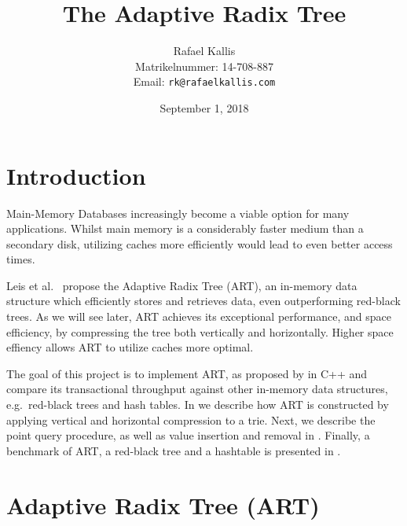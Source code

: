\documentclass[abstracton,12pt]{scrartcl}
\title{The Adaptive Radix Tree}
\author{
    Rafael Kallis\\[-5pt]
    \scriptsize Matrikelnummer: 14-708-887\\[-5pt]
    \scriptsize Email: \texttt{rk@rafaelkallis.com}
}
\date{\vspace*{2cm}September 1, 2018}
\theoremstyle{definition}
\begin{document}
\maketitle





\newpage
\section{Introduction}

Main-Memory Databases increasingly become a viable option for many applications.
Whilst main memory is a considerably faster medium than a secondary disk, 
utilizing caches more efficiently would lead to even better access times.

Leis et al.\ \cite{leis2013adaptive} propose the Adaptive Radix Tree (ART), an in-memory
data structure which efficiently stores and retrieves data, even outperforming
red-black trees.
As we will see later, ART achieves its exceptional performance, and space
efficiency, by compressing the tree both vertically and horizontally.
Higher space effiency allows ART to utilize caches more optimal.

The goal of this project is to implement ART, as proposed by 
\cite{leis2013adaptive} in C++ and compare its transactional throughput
against other in-memory data structures, e.g.\ red-black trees and hash tables.
In  we describe how ART is constructed by applying 
vertical and horizontal compression to a trie.
Next, we describe the point query procedure, as well as 
value insertion and removal in .
Finally, a benchmark of ART, a red-black tree and a hashtable
is presented in .

\section{Adaptive Radix Tree (ART)}
\label{sec:art}
\end{document}

